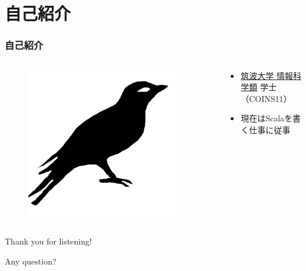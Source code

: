 





\newcommand\ballref[1]{%
\tikz \node[circle, shade,ball color=structure.fg,inner sep=0pt,%
  text width=8pt,font=\tiny,align=center] {\color{white}\ref{#1}};
}




\frame{\maketitle}

\section{自己紹介}
\begin{frame}[fragile]
  \frametitle{自己紹介}
  
  \begin{columns}
    \begin{column}{0.4\textwidth}
      \centering
      \begin{figure}
        \includegraphics[width=0.9\textwidth]{img/bird2x.png}
      \end{figure}
    \end{column}
    \begin{column}{0.6\textwidth}
      \begin{itemize}
        \item<2-> \href{https://www.coins.tsukuba.ac.jp/}{筑波大学 情報科学類} 学士（COINS11）
        \item<3-> 現在はScalaを書く仕事に従事
      \end{itemize}
    \end{column}
  \end{columns}
\end{frame}

\begin{frame}
  \centering
  {\Huge Thank you for listening!}

  \quad

  {\Huge Any question?}
\end{frame}


